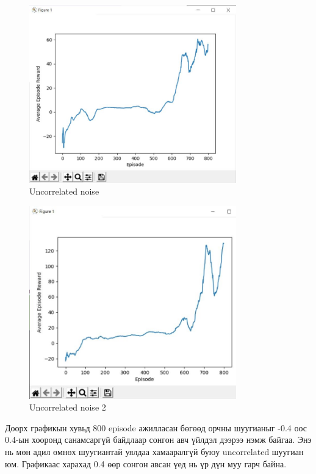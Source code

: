 \documentclass[12pt,A4]{report}
\begin{document}
\begin{figure}[H]
\centering
\includegraphics[width=0.8\textwidth]{./images/after_800_ep_02}
\caption{Uncorrelated noise}
\end{figure}

\begin{figure}[H]
\centering
\includegraphics[width=0.8\textwidth]{./images/after_800_ep_02_am}
\caption{Uncorrelated noise 2}
\end{figure}

Доорх графикын хувьд 800 episode ажилласан бөгөөд орчны шуугианыг -0.4 оос 0.4-ын хооронд санамсаргүй байдлаар сонгон авч үйлдэл дээрээ нэмж байгаа. Энэ нь мөн адил өмнөх шуугиантай уялдаа хамааралгүй буюу uncorrelated шуугиан юм. Графикаас харахад 0.4 өөр сонгон авсан үед нь үр дүн муу гарч байна.
\end{document}
